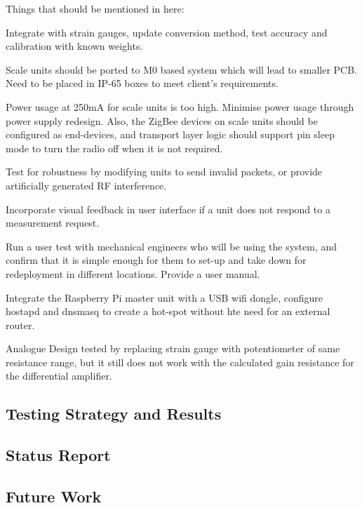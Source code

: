 Things that should be mentioned in here:

Integrate with strain gauges, update conversion method, test accuracy and calibration with known weights.

Scale units should be ported to M0 based system which will lead to smaller PCB. Need to be placed in IP-65 boxes to meet client's requirements.

Power usage at 250mA for scale units is too high. Minimise power usage through power supply redesign. Also, the ZigBee devices on scale units should be configured as end-devices, and transport layer logic should support pin sleep mode to turn the radio off when it is not required.

Test for robustness by modifying units to send invalid packets, or provide artificially generated RF interference.

Incorporate visual feedback in user interface if a unit does not respond to a measurement request.

Run a user test with mechanical engineers who will be using the system, and confirm that it is simple enough for them to set-up and take down for redeployment in different locations. Provide a user manual.

Integrate the Raspberry Pi master unit with a USB wifi dongle, configure hostapd and dnsmasq to create a hot-spot without hte need for an external router.

Analogue Design tested by replacing strain gauge with potentiometer of same resistance range, but it still does not work with the calculated gain resistance for the differential amplifier.

\subsection{Testing Strategy and Results}
\subsection{Status Report}
\subsection{Future Work}


